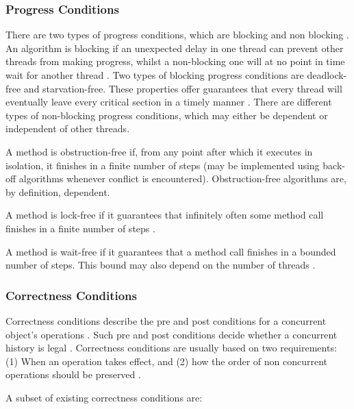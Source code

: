 \documentclass[a4paper, 12pt, titlepage]{article}
\begin{document}
\begin{singlespace}
\subsubsection{Progress Conditions}
There are two types of progress conditions, which are blocking and non blocking \cite[Chapter~3.7]{herlihy2020art}. An algorithm is blocking if an unexpected delay in one thread can prevent other threads from making progress, whilst a non-blocking one will at no point in time wait for another thread \cite[Chapter~3.7]{herlihy2020art}. Two types of blocking progress conditions are deadlock-free and starvation-free. These properties offer guarantees that every thread will eventually leave every critical section in a timely manner \cite[Chapter~3.7.1]{herlihy2020art}. There are different types of non-blocking progress conditions, which may either be dependent or independent of other threads. 

A method is obstruction-free if, from any point after which it executes in isolation, it finishes in a finite number of steps (may be implemented using back-off algorithms whenever conflict is encountered)\cite{herlihy2020art,herlihy2003obstruction}. Obstruction-free algorithms are, by definition, dependent.

A method is lock-free if it guarantees that infinitely often some method call finishes in a finite number of steps \cite{herlihy2020art}.

A method is wait-free if it guarantees that a method call finishes in a bounded number of steps. This bound may also depend on the number of threads \cite{herlihy2020art}.

\subsubsection{Correctness Conditions}

Correctness conditions describe the pre and post conditions for a concurrent object's operations \cite{herlihy2020art}. Such pre and post conditions decide whether a concurrent history is legal \cite{herlihy1990linearizability}. Correctness conditions are usually based on two requirements: (1) When an operation takes effect, and (2) how the order of non concurrent operations should be preserved \cite{herlihy1990linearizability}.

A subset of existing correctness conditions are:


\end{singlespace}
\end{document}
